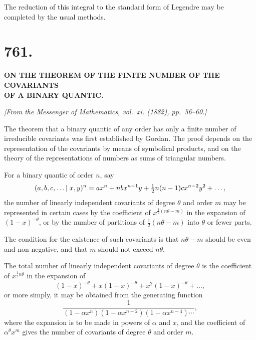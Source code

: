 \documentclass[12pt,a4paper]{article}
\begin{document}
The reduction of this integral to the standard form of Legendre may be
completed by the usual methods.

\newpage


\section*{761.}

\begin{center}
\textbf{ON THE THEOREM OF THE FINITE NUMBER OF THE COVARIANTS}\\[3pt]
\textbf{OF A BINARY QUANTIC.}
\end{center}

\begin{flushright}
\textit{[From the Messenger of Mathematics, vol.~xi. (1882), pp.~56--60.]}
\end{flushright}

The theorem that a binary quantic of any order has only a finite number of
irreducible covariants was first established by Gordan. The proof depends on
the representation of the covariants by means of symbolical products, and on
the theory of the representations of numbers as sums of triangular numbers.

For a binary quantic of order $n$, say
%
\[
(a, b, c, \ldots \mspace{-2mu}\mid x, y)^n
= a x^n + n b x^{n-1} y + \tfrac{1}{2}n(n-1) c x^{n-2} y^2 + \ldots,
\]
%
the number of linearly independent covariants of degree $\theta$ and order $m$
may be represented in certain cases by the coefficient of $x^{\frac{1}{2}(n\theta-m)}$
in the expansion of $(1-x)^{-\theta}$, or by the number of partitions of
$\tfrac{1}{2}(n\theta-m)$ into $\theta$ or fewer parts.

The condition for the existence of such covariants is that $n\theta - m$ should
be even and non-negative, and that $m$ should not exceed $n\theta$.

The total number of linearly independent covariants of degree $\theta$ is
the coefficient of $x^{\frac{1}{2}n\theta}$ in the expansion of
%
\[
(1-x)^{-\theta} + x(1-x)^{-\theta} + x^2(1-x)^{-\theta} + \ldots,
\]
%
or more simply, it may be obtained from the generating function
%
\[
\frac{1}{(1-\alpha x^n)(1-\alpha x^{n-2})(1-\alpha x^{n-4})\cdots},
\]
%
where the expansion is to be made in powers of $\alpha$ and $x$, and the coefficient
of $\alpha^{\theta} x^m$ gives the number of covariants of degree $\theta$ and order $m$.
\end{document}
